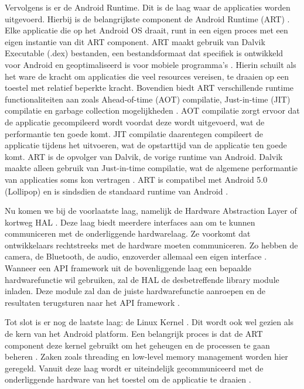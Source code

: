 Vervolgens is er de Android Runtime. Dit is de laag waar de applicaties worden uitgevoerd. Hierbij is de belangrijkste component de Android Runtime (ART) \autocite{Bron7}. Elke applicatie die op het Android OS draait, runt in een eigen proces met een eigen instantie van dit ART component. ART maakt gebruik van Dalvik Executable (.dex) bestanden, een bestandsformaat dat specifiek is ontwikkeld voor Android en geoptimaliseerd is voor mobiele programma's \autocite{Bron14}. Hierin schuilt als het ware de kracht om applicaties die veel resources vereisen, te draaien op een toestel met relatief beperkte kracht. Bovendien biedt ART verschillende runtime functionaliteiten aan zoals Ahead-of-time (AOT) compilatie, Just-in-time (JIT) compilatie en garbage collection mogelijkheden \autocite{Bron7, Bron14}. AOT compilatie zorgt ervoor dat de applicatie gecompileerd wordt voordat deze wordt uitgevoerd, wat de performantie ten goede komt. JIT compilatie daarentegen compileert de applicatie tijdens het uitvoeren, wat de opstarttijd van de applicatie ten goede komt. ART is de opvolger van Dalvik, de vorige runtime van Android. Dalvik maakte alleen gebruik van Just-in-time compilatie, wat de algemene performantie van applicaties soms kon vertragen \autocite{Bron13}. ART is compatibel met Android 5.0 (Lollipop) en is sindsdien de standaard runtime van Android \autocite{Bron7, Bron13}.

Nu komen we bij de voorlaatste laag, namelijk de Hardware Abstraction Layer of kortweg HAL \autocite{Bron7}. Deze laag biedt meerdere interfaces aan om te kunnen communiceren met de onderliggende hardwarelaag. Ze voorkomt dat ontwikkelaars rechtstreeks met de hardware moeten communiceren. Zo hebben de camera, de Bluetooth, de audio, enzoverder allemaal een eigen interface \autocite{Bron7}. Wanneer een API framework uit de bovenliggende laag een bepaalde hardwarefunctie wil gebruiken, zal de HAL de desbetreffende library module inladen. Deze module zal dan de juiste hardwarefunctie aanroepen en de resultaten terugsturen naar het API framework \autocite{Bron7}.

Tot slot is er nog de laatste laag: de Linux Kernel \autocite{Bron7, Bron13}. Dit wordt ook wel gezien als de kern van het Android platform. Een belangrijk proces is dat de ART component deze kernel gebruikt om het geheugen en de processen te gaan beheren \autocite{Bron7, Bron13}. Zaken zoals threading en low-level memory management worden hier geregeld. Vanuit deze laag wordt er uiteindelijk gecommuniceerd met de onderliggende hardware van het toestel om de applicatie te draaien \autocite{Bron13}.

